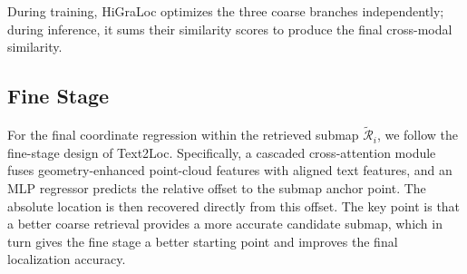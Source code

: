 \documentclass{article}
\begin{document}
During training, HiGraLoc optimizes the three coarse branches independently; during inference, it sums their similarity scores to produce the final cross-modal similarity.
\subsection{Fine Stage}
For the final coordinate regression within the retrieved submap $\tilde{\mathcal{R}}_i$, we follow the fine-stage design of Text2Loc. Specifically, a cascaded cross-attention module fuses geometry-enhanced point-cloud features with aligned text features, and an MLP regressor predicts the relative offset to the submap anchor point. The absolute location is then recovered directly from this offset. The key point is that a better coarse retrieval provides a more accurate candidate submap, which in turn gives the fine stage a better starting point and improves the final localization accuracy.         
\begin{table}[t]
\centering
\caption{A comprehensive comparison between HiGraLoc and existing state-of-the-art methods on the KITTI360Pose (test set) and StreetLoc dataset. }
\label{table:compare_with_sota}
\small 
{}
\end{table}
\end{document}

